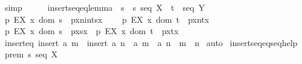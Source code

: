 \begin{isabellebody}
\isamarkupfalse%
\ simp\isanewline
{}\isamarkupfalse%
%
\endisatagproof
{\isafoldproof}%
%
\isadelimproof
\isanewline
%
\endisadelimproof
\isanewline
\isanewline
\isanewline
\isanewline
\isanewline
\isanewline
\isanewline
\isanewline
\ \isanewline
\ \ \isanewline
{}\isamarkupfalse%
\ insertseq{\isacharunderscore}eq{\isacharunderscore}lemma{\isacharcolon}\ \ {\isachardoublequoteopen}{\isacharbang}{\isacharbang}s{\isachardot}\ {\isasymlbrakk}\ s{\isacharcolon}\ seq\ X\ {\isacharsemicolon}\ t\ {\isacharcolon}\ seq\ Y{\isasymrbrakk}\ {\isasymLongrightarrow}\isanewline
\ {\isacharbraceleft}p{\isachardot}\ EX\ x{\isacharcolon}\ dom\ s\ {\isachardot}\ p{\isacharequal}{\isacharparenleft}x{\isacharplus}{\isacharparenleft}n{\isacharcolon}{\isacharcolon}int{\isacharparenright}{\isacharcomma}s{\isacharpercent}{\isacharcircum}x{\isacharparenright}{\isacharbraceright}\ {\isacharequal}\ \ \isanewline
\ {\isacharbraceleft}p{\isachardot}\ EX\ x{\isacharcolon}\ dom\ t\ {\isachardot}\ p{\isacharequal}{\isacharparenleft}x{\isacharplus}n{\isacharcomma}t{\isacharpercent}{\isacharcircum}x{\isacharparenright}{\isacharbraceright}\ {\isacharminus}{\isacharminus}{\isachargreater}\ \ \isanewline
\ {\isacharbraceleft}p{\isachardot}\ EX\ x{\isacharcolon}\ dom\ s\ {\isachardot}\ p{\isacharequal}{\isacharparenleft}x{\isacharcomma}s{\isacharpercent}{\isacharcircum}x{\isacharparenright}{\isacharbraceright}\ {\isacharequal}\ {\isacharbraceleft}p{\isachardot}\ EX\ x{\isacharcolon}\ dom\ t\ {\isachardot}\ p{\isacharequal}{\isacharparenleft}x{\isacharcomma}t{\isacharpercent}{\isacharcircum}x{\isacharparenright}{\isacharbraceright}{\isachardoublequoteclose}\isanewline
\isanewline
\isanewline
\isanewline
{}\isamarkupfalse%
\ insert{\isacharunderscore}eq{\isacharcolon}\ {\isachardoublequoteopen}insert\ a\ m\ {\isacharequal}\ insert\ a\ n\ {\isacharminus}{\isacharminus}{\isachargreater}\ a\ {\isachartilde}{\isacharcolon}m\ {\isacharminus}{\isacharminus}{\isachargreater}\ a{\isachartilde}{\isacharcolon}\ n\ {\isacharminus}{\isacharminus}{\isachargreater}\ m\ {\isacharequal}\ n{\isachardoublequoteclose}\isanewline
%
\isadelimproof
%
\endisadelimproof
%
\isatagproof
{}\isamarkupfalse%
\ auto\isanewline
{}\isamarkupfalse%
%
\endisatagproof
{\isafoldproof}%
%
\isadelimproof
\isanewline
%
\endisadelimproof
\isanewline
\isanewline
{}\isamarkupfalse%
\ insertseq{\isacharunderscore}eq{\isacharunderscore}seq{\isacharunderscore}help{\isacharcolon}\ \isanewline
{}\ prem{}{\isacharcolon}\ {\isachardoublequoteopen}s{\isacharcolon}\ seq\ X{\isachardoublequoteclose}\isanewline

\end{isabellebody}
